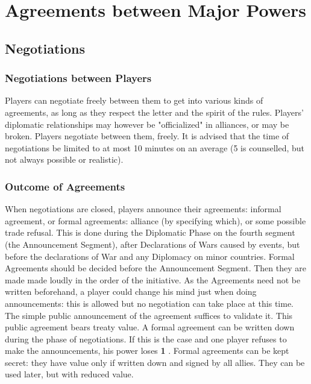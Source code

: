 
\section{Agreements between Major Powers}




\subsection{Negotiations}


\subsubsection{Negotiations between Players}
\aparag
Players can negotiate freely between them to get into various kinds of
agreements, as long as they respect the letter and the spirit of the
rules. Players' diplomatic relationships may however be "officialized" in
alliances, or may be broken.
\aparag
Players negotiate between them, freely. It is advised that the time of
negotiations be limited to at most 10 minutes on an average (5 is counselled,
but not always possible or realistic).


\subsubsection{Outcome of Agreements}
\aparag When negotiations are closed, players announce their agreements:
informal agreement, or formal agreements: alliance (by specifying which), or
some possible trade refusal.
\bparag
This is done during the Diplomatic Phase on the fourth segment (the
Announcement Segment), after Declarations of Wars caused by events, but before
the declarations of War and any Diplomacy on minor countries.
\bparag Formal Agreements should be decided before the Announcement
Segment. Then they are made made loudly in the order of the initiative. As the
Agreements need not be written beforehand, a player could change his mind just
when doing announcements: this is allowed but no negotiation can take place at
this time.
\bparag
The simple public announcement of the agreement suffices to validate it. This
public agreement bears treaty value.
\bparag A formal agreement can be written down during the phase of
negotiations. If this is the case and one player refuses to make the
announcements, his power loses {\bf 1} \STAB.
\bparag Formal agreements can be kept secret: they have value only if written
down and signed by all allies. They can be used later, but with reduced value.

